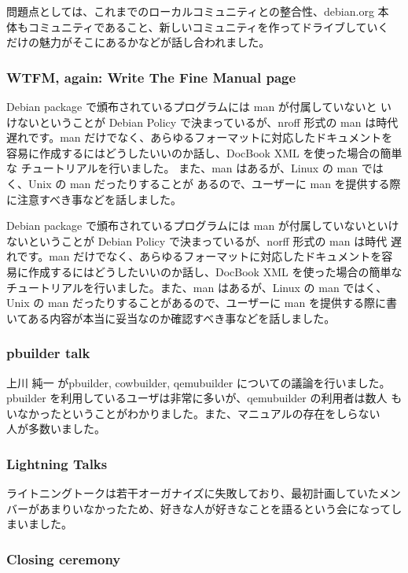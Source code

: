 \documentclass[mingoth,a4paper]{jsarticle}
\begin{document}
  問題点としては、これまでのローカルコミュニティとの整合性、debian.org 本
  体もコミュニティであること、新しいコミュニティを作ってドライブしていく
  だけの魅力がそこにあるかなどが話し合われました。

\subsubsection{WTFM, again: Write The Fine Manual page}

Debian package で頒布されているプログラムには man が付属していないと
いけないということが Debian Policy で決まっているが、nroff 形式の man
は時代遅れです。man だけでなく、あらゆるフォーマットに対応したドキュメントを
容易に作成するにはどうしたいいのか話し、DocBook XML を使った場合の簡単な
チュートリアルを行いました。
また、man はあるが、Linux の man ではく、Unix の man だったりすることが
あるので、ユーザーに man を提供する際に注意すべき事などを話しました。

Debian package で頒布されているプログラムには man が付属していないといけ
ないということが Debian Policy で決まっているが、norff 形式の man は時代
遅れです。man だけでなく、あらゆるフォーマットに対応したドキュメントを容
易に作成するにはどうしたいいのか話し、DocBook XML を使った場合の簡単な
チュートリアルを行いました。また、man はあるが、Linux の man ではく、
Unix の man だったりすることがあるので、ユーザーに man を提供する際に書
いてある内容が本当に妥当なのか確認すべき事などを話しました。
 
\subsubsection{pbuilder talk}

上川 純一 がpbuilder, cowbuilder, qemubuilder についての議論を行いました。
pbuilder を利用しているユーザは非常に多いが、qemubuilder の利用者は数人
もいなかったということがわかりました。また、マニュアルの存在をしらない　
人が多数いました。

\subsubsection{Lightning Talks}

ライトニングトークは若干オーガナイズに失敗しており、最初計画していたメン
バーがあまりいなかったため、好きな人が好きなことを語るという会になってし
まいました。

\subsubsection{Closing ceremony}
\end{document}
